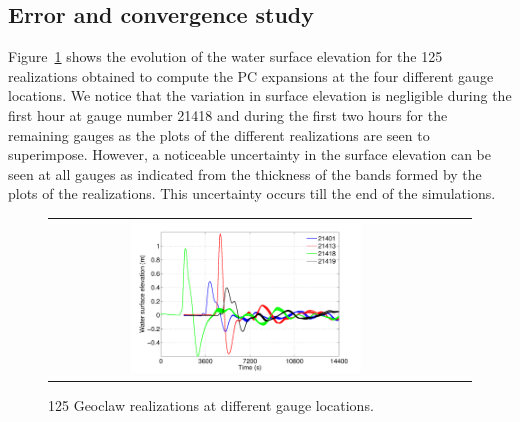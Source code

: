 \subsection{Error and convergence study}
\label{sec:analysis}

Figure~\ref{fig:rlzs} shows the evolution of the
water surface elevation for the 125 realizations obtained 
to compute the PC expansions at the four different gauge 
locations. We notice that the variation in surface elevation 
is negligible during the first hour at gauge number 21418 
and during the first two hours for the remaining gauges
as the plots of the different realizations are seen to superimpose.
However, a noticeable uncertainty in the surface 
elevation can be seen  at all gauges as indicated from the thickness 
of the bands formed by the plots of the realizations. This uncertainty
occurs till the end of the simulations.
\begin{figure}[h]
\centering
\begin{tabular}{clc}        
\includegraphics[width=0.6\textwidth]{figures/rlzs_gauges.pdf} 
\end{tabular}
\caption{125 Geoclaw realizations at different gauge locations.}
\label{fig:rlzs}
\end{figure}


